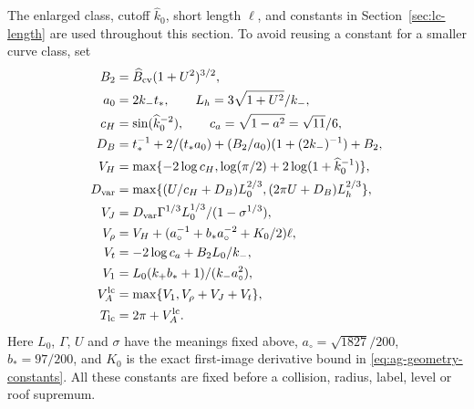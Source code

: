 The enlarged class, cutoff $\widehat k_0$, short length $\ell$, and
constants in Section~\ref{sec:lc-length} are used throughout this
section.  To avoid reusing a constant for a smaller curve class, set
\begin{align}
 B_2&=\widehat B_{\rm cv}(1+U^2)^{3/2},\notag\\
 a_0&=2k_-t_*,\qquad L_h=3\sqrt{1+U^2}/k_-,\notag\\
 c_H&=\sin(\widehat k_0^{-2}),\qquad
 c_a=\sqrt{1-a^2}=\sqrt{11}/6,\notag\\
 D_B&=t_*^{-1}+2/(t_*a_0)
              +(B_2/a_0)(1+(2k_-)^{-1})+B_2,\notag\\
 V_H&=\max\{-2\log c_H,
             \log(\pi/2)+2\log(1+\widehat k_0^{-1})\},
                                                   \label{eq:lc-turn-one}\\
 D_{\rm var}&=\max\{(U/c_H+D_B)L_0^{2/3},
                         (2\pi U+D_B)L_h^{2/3}\},\notag\\
 V_J&=D_{\rm var}\Gamma^{1/3}L_0^{1/3}/(1-\sigma^{1/3}),\notag\\
 V_\rho&=V_H+(a_\circ^{-1}+b_*a_\circ^{-2}+K_0/2)\ell,\notag\\
 V_t&=-2\log c_a+B_2L_0/k_-,\notag\\
 V_1&=L_0(k_+b_*+1)/(k_-a_\circ^2),\notag\\
 V_A^{\rm lc}&=\max\{V_1,V_\rho+V_J+V_t\},\notag\\
 T_{\rm lc}&=2\pi+V_A^{\rm lc}.
                                                   \label{eq:lc-turn-two}
\end{align}
Here $L_0$, $\Gamma$, $U$ and $\sigma$ have the meanings fixed above,
$a_\circ=\sqrt{1827}/200$, $b_*=97/200$, and $K_0$ is the exact
first-image derivative bound in \eqref{eq:ag-geometry-constants}.
All these constants are fixed before a collision, radius, label, level
or roof supremum.

